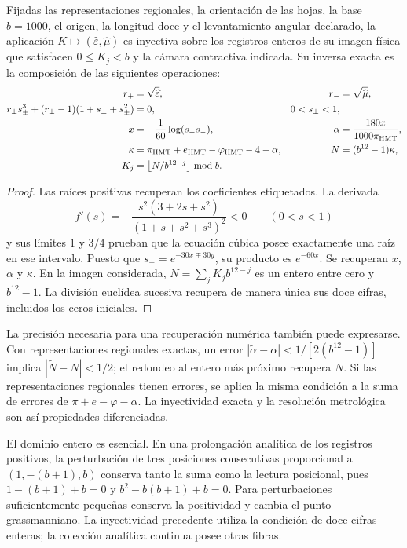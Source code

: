 \begin{theorem}
\label{thm:compat-recuperacion-constitutiva}
Fijadas las representaciones regionales, la orientación de las hojas, la
base \(b=1000\), el origen, la longitud doce y el levantamiento angular
declarado, la aplicación
\(K\mapsto(\widehat\varepsilon,\widehat\mu)\) es inyectiva
sobre los registros enteros de su imagen física que satisfacen
\(0\leq K_j<b\) y la cámara contractiva indicada. Su inversa exacta
es la composición de las siguientes operaciones:
\begin{align*}
 r_+&=\sqrt{\widehat\varepsilon},&
 r_-&=\sqrt{\widehat\mu},\\
 r_\pm s_\pm^3+(r_\pm-1)(1+s_\pm+s_\pm^2)&=0,
 &0<s_\pm<1,\\
 x&=-\frac1{60}\log(s_+s_-),&
 \alpha&=\frac{180x}{1000\pi_{\rm HMT}},\\
 \kappa&=\pi_{\rm HMT}+e_{\rm HMT}-\varphi_{\rm HMT}-4-\alpha,
 &N&=(b^{12}-1)\kappa,\\
 K_j&=\left\lfloor N/b^{12-j}\right\rfloor\bmod b.
\end{align*}
\end{theorem}
\begin{proof}
Las raíces positivas recuperan los coeficientes etiquetados.
La derivada
\[
 f'(s)=-\frac{s^2(3+2s+s^2)}{(1+s+s^2+s^3)^2}<0
 \qquad(0<s<1)
\]
y sus límites \(1\) y \(3/4\) prueban que la ecuación cúbica
posee exactamente una raíz en ese intervalo. Puesto que
\(s_\pm=e^{-30x\mp30y}\), su producto es \(e^{-60x}\).
Se recuperan \(x\), \(\alpha\) y \(\kappa\).
En la imagen considerada, \(N=\sum_jK_jb^{12-j}\) es un entero
entre cero y \(b^{12}-1\). La división euclídea sucesiva recupera
de manera única sus doce cifras, incluidos los ceros iniciales.
\end{proof}

La precisión necesaria para una recuperación numérica también puede
expresarse. Con representaciones regionales exactas, un error
\(|\widetilde\alpha-\alpha|<1/[2(b^{12}-1)]\) implica
\(|\widetilde N-N|<1/2\); el redondeo al entero más próximo
recupera \(N\). Si las representaciones regionales tienen errores, se
aplica la misma condición a la suma de errores de
\(\pi+e-\varphi-\alpha\). La inyectividad exacta y la resolución
metrológica son así propiedades diferenciadas.

El dominio entero es esencial. En una prolongación analítica de los
registros positivos, la perturbación de tres posiciones consecutivas
proporcional a \((1,-(b+1),b)\) conserva tanto la suma como la
lectura posicional, pues
\(1-(b+1)+b=0\) y \(b^2-b(b+1)+b=0\).
Para perturbaciones suficientemente pequeñas conserva la positividad
y cambia el punto grassmanniano. La inyectividad precedente utiliza
la condición de doce cifras enteras; la colección analítica continua
posee otras fibras.

